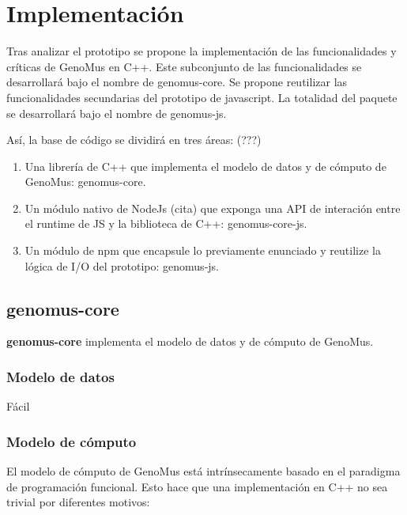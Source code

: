 \chapter{Implementación}

Tras analizar el prototipo se propone la implementación de las funcionalidades y críticas de GenoMus en C++. Este subconjunto de las funcionalidades se desarrollará bajo el nombre de genomus-core. Se propone reutilizar las funcionalidades secundarias del prototipo de javascript. La totalidad del paquete se desarrollará bajo el nombre de genomus-js.

Así, la base de código se dividirá en tres áreas: (???)

\begin{enumerate} 
    \item Una librería de C++ que implementa el modelo de datos y de cómputo de GenoMus: genomus-core\cite{genomus-core}.
    \item Un módulo nativo de NodeJs (cita) que exponga una API de interación entre el runtime de JS y la biblioteca de C++: genomus-core-js\cite{genomus-core-js}.
    \item Un módulo de npm que encapsule lo previamente enunciado y reutilize la lógica de I/O del prototipo: genomus-js.
\end{enumerate}

\section{genomus-core}

\textbf{genomus-core} implementa el modelo de datos y de cómputo de GenoMus. 

\subsection{Modelo de datos}

Fácil

\subsection{Modelo de cómputo}
El modelo de cómputo de GenoMus está intrínsecamente basado en el paradigma de programación funcional. Esto hace que una implementación en C++ no sea trivial por diferentes motivos:

